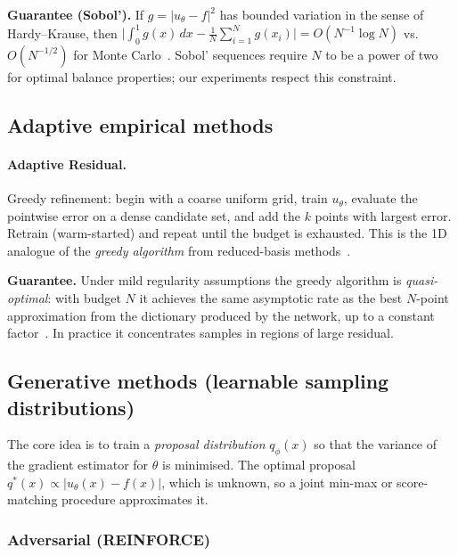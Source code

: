\documentclass[11pt,a4paper]{article}
\begin{document}
\textbf{Guarantee (Sobol').}
If $g = |u_\theta-f|^2$ has bounded variation in the sense of
Hardy--Krause, then
$\bigl|\int_0^1 g(x)\,dx - \frac1N\sum_{i=1}^N g(x_i)\bigr|
= O(N^{-1}\log N)$
vs.\ $O(N^{-1/2})$ for Monte Carlo~\citep{dick2010digital}.
Sobol' sequences require $N$ to be a power of two for optimal balance
properties; our experiments respect this constraint.

\subsection{Adaptive empirical methods}
\label{sec:adaptive}

\paragraph{Adaptive Residual.}
Greedy refinement: begin with a coarse uniform grid, train $u_\theta$,
evaluate the pointwise error on a dense candidate set, and add the $k$
points with largest error.  Retrain (warm-started) and repeat until the
budget is exhausted.  This is the 1D analogue of the \emph{greedy
algorithm} from reduced-basis methods~\citep{binev2011convergence}.

\textbf{Guarantee.}
Under mild regularity assumptions the greedy algorithm is
\emph{quasi-optimal}: with budget $N$ it achieves the same asymptotic
rate as the best $N$-point approximation from the dictionary produced by
the network, up to a constant factor~\citep{deVore2013greedy}.
In practice it concentrates samples in regions of large residual.

\subsection{Generative methods (learnable sampling distributions)}
\label{sec:generative}

The core idea is to train a \emph{proposal distribution} $q_\phi(x)$ so
that the variance of the gradient estimator for $\theta$ is minimised.
The optimal proposal $q^*(x)\propto |u_\theta(x)-f(x)|$, which is unknown,
so a joint min-max or score-matching procedure approximates it.

\subsubsection{Adversarial (REINFORCE)}
\label{sec:adversarial}
\end{document}

